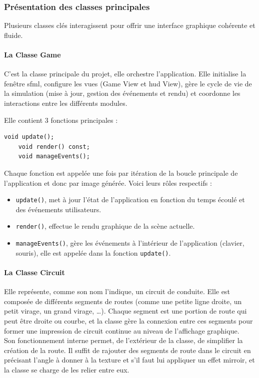\subsubsection{Présentation des classes principales}\label{subsubsec:presentation-des-classes-principales}
Plusieurs classes clés interagissent pour offrir une interface graphique cohérente et fluide.

\paragraph[Game]{La Classe \textbf{Game}}\label{par:class_game}
C'est la classe principale du projet, elle orchestre l'application.
Elle initialise la fenêtre \gls{sfml}, configure les vues (Game View et \gls{hud} View), gère le cycle de vie de la simulation (mise à jour, gestion des événements et rendu) et coordonne les interactions entre les différents modules.

Elle contient 3 fonctions principales :
\begin{lstlisting}[style=CStyle, label={lst:game_class}]
    void update();
    void render() const;
    void manageEvents();
\end{lstlisting}
Chaque fonction est appelée une fois par itération de la boucle principale de l'application et donc par image générée.
Voici leurs rôles respectifs :
\begin{itemize}
    \item \texttt{update()}, met à jour l'état de l'application en fonction du temps écoulé et des événements utilisateurs.
    \item \texttt{render()}, effectue le rendu graphique de la scène actuelle.
    \item \texttt{manageEvents()}, gère les événements à l'intérieur de l'application (clavier, souris), elle est appelée dans la fonction \texttt{update()}.
\end{itemize}

\paragraph[Circuit]{La Classe \textbf{Circuit}}
Elle représente, comme son nom l'indique, un circuit de conduite.
Elle est composée de différents segments de routes (comme une petite ligne droite, un petit virage, un grand virage, \dots).
Chaque segment est une portion de route qui peut être droite ou courbe, et la classe gère la connexion entre ces segments pour former une impression de circuit continue au niveau de l'affichage graphique. \\
Son fonctionnement interne permet, de l'extérieur de la classe, de simplifier la création de la route.
Il suffit de rajouter des segments de route dans le circuit en précisant l'angle à donner à la texture et s'il faut lui appliquer un effet mirroir, et la classe se charge de les relier entre eux.

